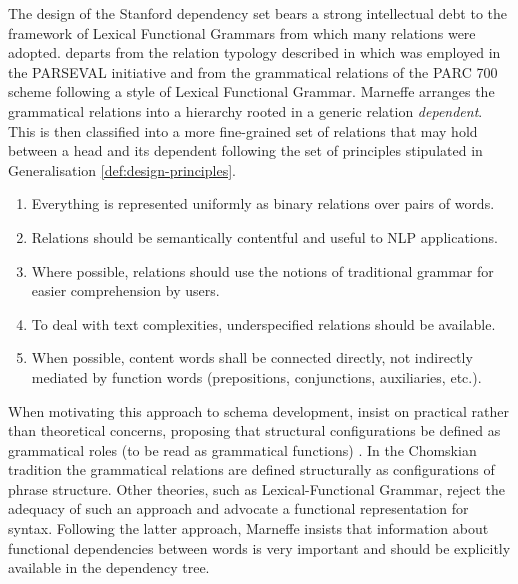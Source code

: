     The design of the Stanford dependency set \citep{Marneffe2006, Marneffe2008,  Marneffe2014, Silveira2014} bears a strong intellectual debt to the framework of Lexical Functional Grammars \citep{bresnan2015lexical} from which many relations  were adopted. \citet{Marneffe2006} departs from the relation typology described in \citet{Carroll1999} which was employed in the PARSEVAL initiative \citep{Harrison1991} and from the grammatical relations of the PARC 700 \citep{King2003} scheme following a style of Lexical Functional Grammar. Marneffe arranges the grammatical relations into a hierarchy rooted in a generic relation \textit{dependent}. This is then classified into a more fine-grained set of relations that may hold between a head and its dependent following the set of principles \citep{Marneffe2008a} stipulated in Generalisation \ref{def:design-principles}.

    \begin{generalization}\label{def:design-principles}\leavevmode
        \begin{enumerate}
            \item Everything is represented uniformly as binary relations over pairs of words.
            \item Relations should be semantically contentful and useful to NLP applications.
            \item Where possible, relations should use the notions of traditional grammar \citep{Quirk1985} for easier comprehension by users.
            \item To deal with text complexities, underspecified relations should be available.
            \item When possible, content words shall be connected directly, not indirectly mediated by function words (prepositions, conjunctions, auxiliaries, etc.).
        \end{enumerate}
    \end{generalization}

    When motivating this approach to schema development, \citet{Marneffe2006} insist on practical rather than theoretical concerns, proposing that structural configurations be defined as grammatical roles (to be read as grammatical functions) \citep{Marneffe2006}. In the Chomskian tradition \citep{Chomsky57} the grammatical relations are defined structurally as configurations of phrase structure. Other theories, such as Lexical-Functional Grammar, reject the adequacy of such an approach \citep{bresnan2015lexical} and advocate a functional representation for syntax. Following the latter approach, Marneffe insists that information about functional dependencies between words is very important and should be explicitly available in the dependency tree. 

